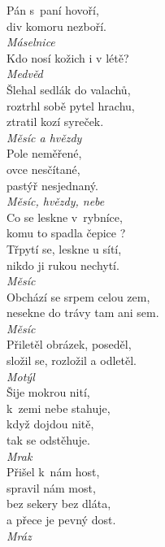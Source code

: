 \begin{multicols}{\value{columnsthindata}}
\noindent
Pán s~paní hovoří,\\
div komoru nezboří.\\[1 mm]
{\sl Máselnice}\\

\noindent
Kdo nosí kožich i v létě?\\[1 mm]
{\sl Medvěd}\\

\noindent
Šlehal sedlák do valachů,\\
roztrhl sobě pytel hrachu,\\
ztratil kozí syreček.\\[1 mm]
{\sl Měsíc a hvězdy}\\

\noindent
Pole neměřené,\\
ovce nesčítané,\\
pastýř nesjednaný.\\[1 mm]
{\sl Měsíc, hvězdy, nebe}\\

\noindent
Co se leskne v~rybníce,\\
komu to spadla čepice ?\\
Třpytí se, leskne u sítí,\\
nikdo ji rukou nechytí.\\[1 mm]
{\sl Měsíc}\\

\noindent
Obchází se srpem celou zem,\\
nesekne do trávy tam ani sem.\\[1 mm]
{\sl Měsíc}\\

\noindent
Přiletěl obrázek, poseděl,\\
složil se, rozložil a odletěl.\\[1 mm]
{\sl Motýl}\\

\noindent
Šije mokrou nití,\\
k~zemi nebe stahuje,\\
když dojdou nitě,\\
tak se odstěhuje.\\[1 mm]
{\sl Mrak}\\

\noindent
Přišel k~nám host,\\
spravil nám most,\\
bez sekery bez dláta,\\
a přece je pevný dost.\\[1 mm]
{\sl Mráz}\\


\end{multicols}
